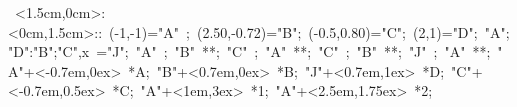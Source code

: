 

\hbox{
   \xy    <1.5cm,0cm>:<0cm,1.5cm>::
       (-1,-1)="A" ;  (2.50,-0.72)="B";  
       (-0.5,0.80)="C";   (2,1)="D"; {"A";"D":"B";"C",x} ="J";
	 "A" ; "B" **\dir{-}; 
       "C" ; "A" **\dir{-};        "C" ; "B" **\dir{-}; 
       "J" ; "A" **\dir{-}; 
       "A"+<-0.7em,0ex> *{A};
       "B"+<0.7em,0ex> *{B};
       "J"+<0.7em,1ex> *{D};
       "C"+<-0.7em,0.5ex> *{C};
       "A"+<1em,3ex> *{1};
       "A"+<2.5em,1.75ex> *{2};
   \endxy}
